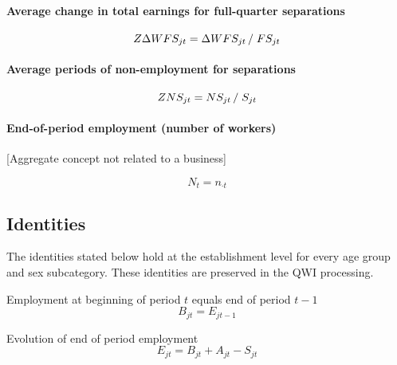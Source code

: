 \paragraph{Average change in total earnings for full-quarter separations}

\begin{equation}
Z\Delta WFS_{jt} = {\Delta WFS_{jt} } \left/ {\vphantom {{\Delta WFS_{jt} }
{FS_{jt} }}} \right. {FS_{jt} }
\end{equation}

\paragraph{Average periods of non-employment for separations}

\begin{equation}
ZNS_{jt} = {NS_{jt} } \left/ {\vphantom {{NS_{jt} } {S_{jt} }}} \right. {%
S_{jt} }
\end{equation}

\paragraph{End-of-period employment (number of workers)}

[Aggregate concept not related to a business]

\begin{equation}
N_t = n_{\cdot t}
\end{equation}

\subsection{Identities}
\label{sec:identities}

The identities stated below hold at the establishment level for every age
group and sex subcategory. These identities are preserved in the QWI
processing.

\begin{definition}
Employment at beginning of period $t$ equals end of period $t - 1$ 
\begin{equation*}
B_{jt} = E_{jt - 1}
\end{equation*}
\end{definition}

\begin{definition}
Evolution of end of period employment 
\begin{equation*}
E_{jt} = B_{jt} + A_{jt} - S_{jt}
\end{equation*}
\end{definition}

